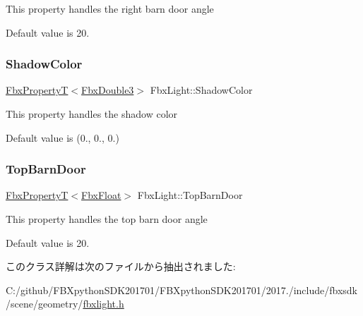 This property handles the right barn door angle

Default value is 20. \mbox{\label{class_fbx_light_aeb8d7f6d6fa57f4dc86ff8e47ff61dbf}} 
\subsubsection{\texorpdfstring{Shadow\+Color}{ShadowColor}}
{\footnotesize\ttfamily \hyperlink{class_fbx_property_t}{Fbx\+PropertyT}$<$\hyperlink{fbxtypes_8h_ae0a96f14cde566774c7553aa7523b7a7}{Fbx\+Double3}$>$ Fbx\+Light\+::\+Shadow\+Color}

This property handles the shadow color

Default value is (0., 0., 0.) \mbox{\label{class_fbx_light_a22b02c12b00c38da4d38a21876ec5340}} 
\subsubsection{\texorpdfstring{Top\+Barn\+Door}{TopBarnDoor}}
{\footnotesize\ttfamily \hyperlink{class_fbx_property_t}{Fbx\+PropertyT}$<$\hyperlink{fbxtypes_8h_aef968e37f2ddc4188de464d8578c1d5c}{Fbx\+Float}$>$ Fbx\+Light\+::\+Top\+Barn\+Door}

This property handles the top barn door angle

Default value is 20. 

このクラス詳解は次のファイルから抽出されました\+:\begin{DoxyCompactItemize}
\item 
C\+:/github/\+F\+B\+Xpython\+S\+D\+K201701/\+F\+B\+Xpython\+S\+D\+K201701/2017./include/fbxsdk/scene/geometry/\hyperlink{fbxlight_8h}{fbxlight.\+h}\end{DoxyCompactItemize}
